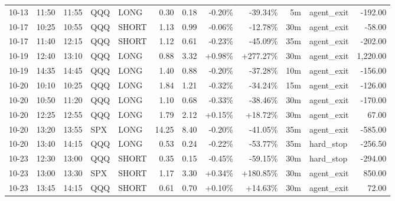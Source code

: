 \documentclass[11pt,a4paper,twoside]{article}
\begin{document}
\begin{center}
\begin{longtable}{>{\color{txtmain}}l l l l l r r r r r >{\color{txtmain}}l r}
10-13 & 11:50 & 11:55 & QQQ & LONG & 0.30 & 0.18 & \textcolor{lossred}{-0.20\%} & \textcolor{lossred}{-39.34\%} & 5m & agent\_exit & \textcolor{lossred}{-192.00} \\
10-17 & 10:25 & 10:55 & QQQ & SHORT & 1.13 & 0.99 & \textcolor{lossred}{-0.06\%} & \textcolor{lossred}{-12.78\%} & 30m & agent\_exit & \textcolor{lossred}{-58.00} \\
10-17 & 11:40 & 12:15 & QQQ & SHORT & 1.12 & 0.61 & \textcolor{lossred}{-0.23\%} & \textcolor{lossred}{-45.09\%} & 35m & agent\_exit & \textcolor{lossred}{-202.00} \\
10-19 & 12:40 & 13:10 & QQQ & LONG & 0.88 & 3.32 & \textcolor{wingreen}{+0.98\%} & \textcolor{wingreen}{+277.27\%} & 30m & agent\_exit & \textcolor{wingreen}{1,220.00} \\
10-19 & 14:35 & 14:45 & QQQ & LONG & 1.40 & 0.88 & \textcolor{lossred}{-0.20\%} & \textcolor{lossred}{-37.28\%} & 10m & agent\_exit & \textcolor{lossred}{-156.00} \\
10-20 & 10:10 & 10:25 & QQQ & LONG & 1.84 & 1.21 & \textcolor{lossred}{-0.32\%} & \textcolor{lossred}{-34.24\%} & 15m & agent\_exit & \textcolor{lossred}{-126.00} \\
10-20 & 10:50 & 11:20 & QQQ & LONG & 1.10 & 0.68 & \textcolor{lossred}{-0.33\%} & \textcolor{lossred}{-38.46\%} & 30m & agent\_exit & \textcolor{lossred}{-170.00} \\
10-20 & 12:25 & 12:55 & QQQ & LONG & 1.79 & 2.12 & \textcolor{wingreen}{+0.15\%} & \textcolor{wingreen}{+18.72\%} & 30m & agent\_exit & \textcolor{wingreen}{67.00} \\
10-20 & 13:20 & 13:55 & SPX & LONG & 14.25 & 8.40 & \textcolor{lossred}{-0.20\%} & \textcolor{lossred}{-41.05\%} & 35m & agent\_exit & \textcolor{lossred}{-585.00} \\
10-20 & 13:40 & 14:15 & QQQ & LONG & 0.53 & 0.24 & \textcolor{lossred}{-0.22\%} & \textcolor{lossred}{-53.77\%} & 35m & hard\_stop & \textcolor{lossred}{-256.50} \\
10-23 & 12:30 & 13:00 & QQQ & SHORT & 0.35 & 0.15 & \textcolor{lossred}{-0.45\%} & \textcolor{lossred}{-59.15\%} & 30m & hard\_stop & \textcolor{lossred}{-294.00} \\
10-23 & 13:00 & 13:30 & SPX & SHORT & 1.17 & 3.30 & \textcolor{wingreen}{+0.34\%} & \textcolor{wingreen}{+180.85\%} & 30m & agent\_exit & \textcolor{wingreen}{850.00} \\
10-23 & 13:45 & 14:15 & QQQ & SHORT & 0.61 & 0.70 & \textcolor{wingreen}{+0.10\%} & \textcolor{wingreen}{+14.63\%} & 30m & agent\_exit & \textcolor{wingreen}{72.00} \\

\end{longtable}
\end{center}
\end{document}
